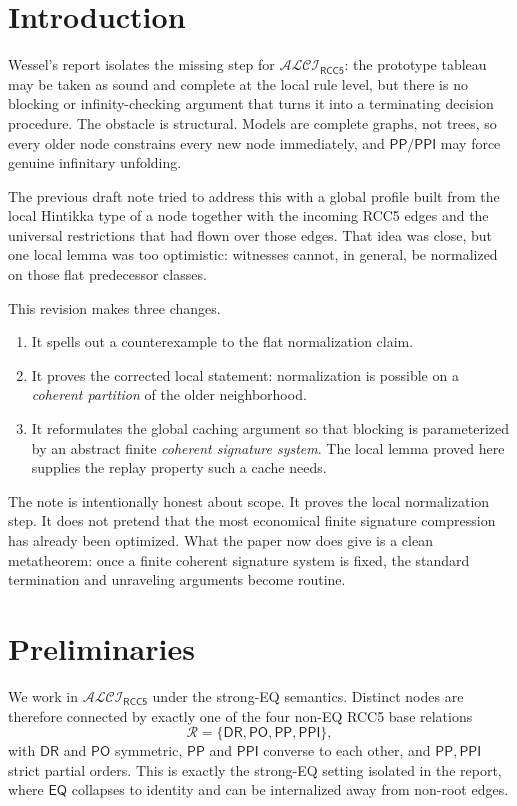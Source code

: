 \documentclass[11pt]{article}
\theoremstyle{definition}
\newcommand{\ALCIRCCFive}{\mathcal{ALCI}_{\mathsf{RCC5}}}
\newcommand{\Roles}{\mathcal{R}}
\newcommand{\DR}{\mathsf{DR}}
\newcommand{\PO}{\mathsf{PO}}
\newcommand{\PP}{\mathsf{PP}}
\newcommand{\PPI}{\mathsf{PPI}}
\newcommand{\EQ}{\mathsf{EQ}}
\begin{document}
\section{Introduction}

Wessel's report isolates the missing step for $\ALCIRCCFive$: the prototype tableau may be taken as sound and complete at the local rule level, but there is no blocking or infinity-checking argument that turns it into a terminating decision procedure. The obstacle is structural. Models are complete graphs, not trees, so every older node constrains every new node immediately, and $\PP/\PPI$ may force genuine infinitary unfolding.

The previous draft note tried to address this with a global profile built from the local Hintikka type of a node together with the incoming RCC5 edges and the universal restrictions that had flown over those edges. That idea was close, but one local lemma was too optimistic: witnesses cannot, in general, be normalized on those flat predecessor classes.

This revision makes three changes.
\begin{enumerate}
  \item It spells out a counterexample to the flat normalization claim.
  \item It proves the corrected local statement: normalization is possible on a \emph{coherent partition} of the older neighborhood.
  \item It reformulates the global caching argument so that blocking is parameterized by an abstract finite \emph{coherent signature system}. The local lemma proved here supplies the replay property such a cache needs.
\end{enumerate}

The note is intentionally honest about scope. It proves the local normalization step. It does not pretend that the most economical finite signature compression has already been optimized. What the paper now does give is a clean metatheorem: once a finite coherent signature system is fixed, the standard termination and unraveling arguments become routine.

\section{Preliminaries}

We work in $\ALCIRCCFive$ under the strong-EQ semantics. Distinct nodes are therefore connected by exactly one of the four non-EQ RCC5 base relations
\[
\Roles = \{\DR,\PO,\PP,\PPI\},
\]
with $\DR$ and $\PO$ symmetric, $\PP$ and $\PPI$ converse to each other, and $\PP,\PPI$ strict partial orders. This is exactly the strong-EQ setting isolated in the report, where $\EQ$ collapses to identity and can be internalized away from non-root edges.
\end{document}
